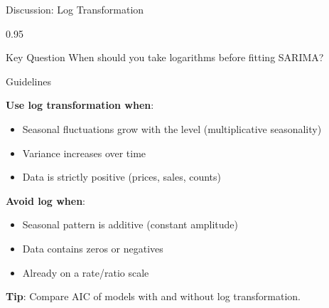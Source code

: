 \documentclass[9pt, aspectratio=169, t]{beamer}
\begin{document}
\begin{frame}{Discussion: Log Transformation}
    \begin{cminipage}{0.95\textwidth}
    \begin{block}{Key Question}
        When should you take logarithms before fitting SARIMA?
    \end{block}

    \vspace{0.05cm}

    \begin{block}{Guidelines}
        {\small
        \textbf{Use log transformation when}:
        \begin{itemize}\setlength{\itemsep}{0pt}
            \item Seasonal fluctuations grow with the level (multiplicative seasonality)
            \item Variance increases over time
            \item Data is strictly positive (prices, sales, counts)
        \end{itemize}

        \vspace{0.05cm}
        \textbf{Avoid log when}:
        \begin{itemize}\setlength{\itemsep}{0pt}
            \item Seasonal pattern is additive (constant amplitude)
            \item Data contains zeros or negatives
            \item Already on a rate/ratio scale
        \end{itemize}

        \vspace{0.05cm}
        \textbf{Tip}: Compare AIC of models with and without log transformation.
        }
    \end{block}
    \end{cminipage}
\end{frame}
\end{document}
